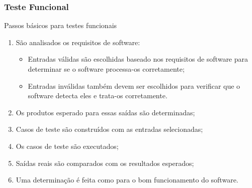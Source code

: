 \begin{frame}[hasprev=true, hasnext=false]
\frametitle{Teste Funcional}

\begin{block:procedure}{Passos básicos para testes funcionais}
\begin{enumerate}
	\item São analisados os requisitos de software:
	\begin{itemize}
		\item Entradas válidas são escolhidas baseado nos requisitos de software
		para determinar se o software processa-os corretamente;

		\item Entradas inválidas também devem ser escolhidos para verificar que o software
		detecta eles e trata-os corretamente.
	\end{itemize}

	\item Os produtos esperado para essas saídas são determinadas;

	\item Casos de teste são construídos com as entradas selecionadas;

	\item Os casos de teste são executados;

	\item Saídas reais são comparados com os resultados esperados;

	\item Uma determinação é feita como para o bom funcionamento do software.
\end{enumerate}
\end{block:procedure}
\end{frame}